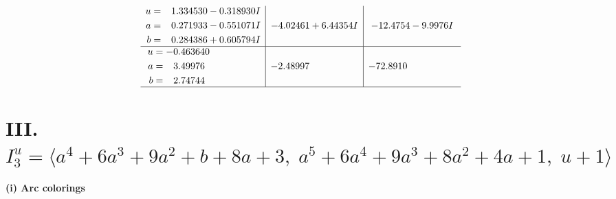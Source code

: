 \documentclass[1p]{elsarticle_modified}
\theoremstyle{definition}
\begin{document}
$$\begin{array}{c|c|c}
\begin{aligned}
u &= \phantom{-}1.334530 - 0.318930 I \\
a &= \phantom{-}0.271933 - 0.551071 I \\
b &= \phantom{-}0.284386 + 0.605794 I\end{aligned}
 & -4.02461 + 6.44354 I & -12.4754 - 9.9976 I \\ \hline\begin{aligned}
u &= -0.463640\phantom{ +0.000000I} \\
a &= \phantom{-}3.49976\phantom{ +0.000000I} \\
b &= \phantom{-}2.74744\phantom{ +0.000000I}\end{aligned}
 & -2.48997\phantom{ +0.000000I} & -72.8910\phantom{ +0.000000I}\\
 \hline 
 \end{array}$$\newpage\newpage\renewcommand{\arraystretch}{1}
\centering \section*{III. $I^u_{3}= \langle a^4+6 a^3+9 a^2+b+8 a+3,\;a^5+6 a^4+9 a^3+8 a^2+4 a+1,\;u+1 \rangle$}
\flushleft \textbf{(i) Arc colorings}\\
\end{document}
